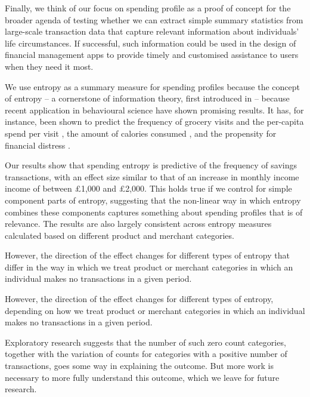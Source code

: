 {\color{red} Finally, we think of our focus on spending profile as a proof of concept for
the broader agenda of testing whether we can extract simple summary statistics
from large-scale transaction data that capture relevant information about
individuals' life circumstances. If successful, such information could be used
in the design of financial management apps to provide timely and customised
assistance to users when they need it most.}

{\color{blue} We use entropy as a summary measure for spending profiles because the concept of entropy -- a cornerstone of information theory, first introduced in \citet{shannon1948mathematical} -- because recent application in behavioural science have shown promising results. It has, for instance, been shown
to predict the frequency of grocery visits and the per-capita spend per visit
\citep{guidotti2015behavioral}, the amount of calories consumed
\citep{skatova2019those}, and the propensity for financial distress
\citep{muggleton2020evidence}.}

Our results show that spending entropy is predictive of the frequency of
savings transactions, with an effect size similar to that of an increase in
monthly income income of between \pounds1,000 and \pounds2,000. This holds true
if we control for simple component parts of entropy, suggesting that the
non-linear way in which entropy combines these components captures something
about spending profiles that is of relevance. The results are also largely
consistent across entropy measures calculated based on different product and
merchant categories.

{\color{red} However, the direction of the effect changes for
different types of entropy that differ in the way in which we treat product or
merchant categories in which an individual makes no transactions in a given
period. }

{\color{blue} However, the direction of the effect changes for
different types of entropy, depending on how we treat product or
merchant categories in which an individual makes no transactions in a given
period.}

Exploratory research suggests that the number of such zero count
categories, together with the variation of counts for categories with a
positive number of transactions, goes some way in explaining the outcome. But
more work is necessary to more fully understand this outcome, which we leave
for future research.

